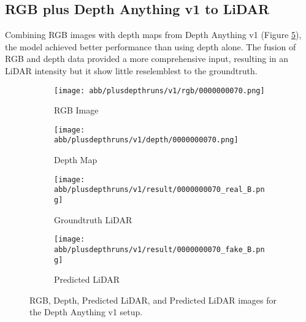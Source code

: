 \subsection{RGB plus Depth Anything v1 to LiDAR}
Combining RGB images with depth maps from Depth Anything v1 (Figure \ref{v1_rgbd}), the model achieved better performance than using depth alone. The fusion of RGB and depth data provided a more comprehensive input, resulting in an LiDAR intensity but it show little reselemblest to the groundtruth.
\begin{figure}[!ht]
	\centering
	\begin{subfigure}{0.4\textwidth}
		\centering
		\texttt{[image: abb/plusdepthruns/v1/rgb/0000000070.png]}
		\caption{RGB Image}
		\label{fig:v1_rgb}
	\end{subfigure}
	
	\vspace{1em} %
	
	\begin{subfigure}{0.4\textwidth}
		\centering
		\texttt{[image: abb/plusdepthruns/v1/depth/0000000070.png]}
		\caption{Depth Map}
		\label{fig:v1_depth}
	\end{subfigure}
	
	\vspace{1em} %
	
	\begin{subfigure}{0.25\textwidth}
		\centering
		\texttt{[image: abb/plusdepthruns/v1/result/0000000070\_real\_B.png]}
		\caption{Groundtruth LiDAR}
		\label{fig:v1_pred_lidar}
	\end{subfigure}
	\begin{subfigure}{0.25\textwidth}
		\centering
		\texttt{[image: abb/plusdepthruns/v1/result/0000000070\_fake\_B.png]}
		\caption{Predicted LiDAR}
		\label{fig:v1_fake_lidar}
	\end{subfigure}
	
	\caption{RGB, Depth, Predicted LiDAR, and Predicted LiDAR images for the Depth Anything v1 setup.}
	\label{v1_rgbd}
\end{figure}
\newpage
